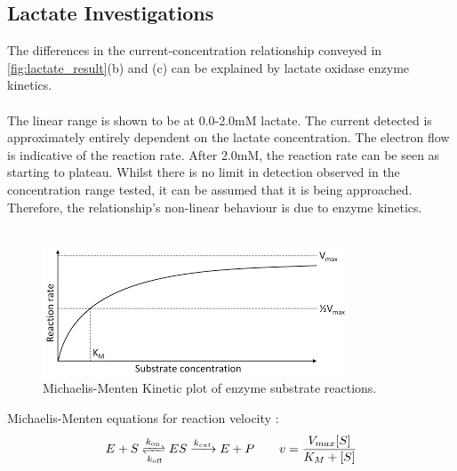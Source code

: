 \subsection{Lactate Investigations}
The differences in the current-concentration relationship conveyed in \autoref{fig:lactate_result}(b) and (c) can be explained by lactate oxidase enzyme kinetics.\\\\
The linear range is shown to be at 0.0-2.0mM lactate. The current detected is approximately entirely dependent on the lactate concentration. The electron flow is indicative of the reaction rate. 
After 2.0mM, the reaction rate can be seen as starting to plateau. Whilst there is no limit in detection observed in the concentration range tested, it can be assumed that it is being approached. Therefore, the relationship's non-linear behaviour is due to enzyme kinetics.\\\\
\begin{figure}[H]
    \centering
    \includegraphics{img/lactate_discussion_1.png}
    \caption{Michaelis-Menten Kinetic plot of enzyme substrate reactions. }
    \label{fig:lactate_discussion}
\end{figure}
\noindent Michaelis-Menten equations for reaction velocity \cite{johnson2011original}:
\begin{equation}
    E + S \xrightleftharpoons[k_{\text{off}}]{k_{\text{on}}} ES \xrightarrow{k_{cat}} E+P \quad \quad v = \frac{V_{max}[S]}{K_{M}+[S]}
\end{equation}
